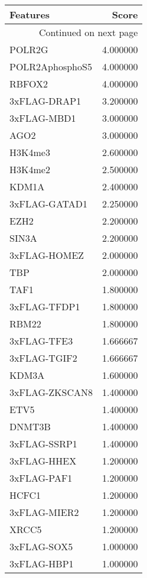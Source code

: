\begin{longtable}{lr}
\caption{}\\
\toprule
        Features &     Score \\
\midrule
\endhead
\midrule
\multicolumn{2}{r}{{Continued on next page}} \\
\midrule
\endfoot

\bottomrule
\endlastfoot
          POLR2G &  4.000000 \\
 POLR2AphosphoS5 &  4.000000 \\
          RBFOX2 &  4.000000 \\
    3xFLAG-DRAP1 &  3.200000 \\
     3xFLAG-MBD1 &  3.000000 \\
            AGO2 &  3.000000 \\
         H3K4me3 &  2.600000 \\
         H3K4me2 &  2.500000 \\
           KDM1A &  2.400000 \\
   3xFLAG-GATAD1 &  2.250000 \\
            EZH2 &  2.200000 \\
           SIN3A &  2.200000 \\
    3xFLAG-HOMEZ &  2.000000 \\
             TBP &  2.000000 \\
            TAF1 &  1.800000 \\
    3xFLAG-TFDP1 &  1.800000 \\
           RBM22 &  1.800000 \\
     3xFLAG-TFE3 &  1.666667 \\
    3xFLAG-TGIF2 &  1.666667 \\
           KDM3A &  1.600000 \\
  3xFLAG-ZKSCAN8 &  1.400000 \\
            ETV5 &  1.400000 \\
          DNMT3B &  1.400000 \\
    3xFLAG-SSRP1 &  1.400000 \\
     3xFLAG-HHEX &  1.200000 \\
     3xFLAG-PAF1 &  1.200000 \\
           HCFC1 &  1.200000 \\
    3xFLAG-MIER2 &  1.200000 \\
           XRCC5 &  1.200000 \\
     3xFLAG-SOX5 &  1.000000 \\
     3xFLAG-HBP1 &  1.000000 \\

\end{longtable}
